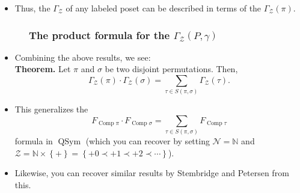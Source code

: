 \documentclass{beamer}
\newcommand{\NN}{{\mathbb N}}
\newcommand{\Comp}{\operatorname{Comp}}
\newcommand{\QSym}{\operatorname{QSym}}
\newcommand{\calN}{\mathcal{N}}
\newcommand{\calZ}{\mathcal{Z}}
\newcommand{\fti}[1]{\frametitle{\ \ \ \ \ #1}}
\newcommand{\set}[1]{\left\{ #1 \right\}}
\newcommand{\tup}[1]{\left( #1 \right)}
\theoremstyle{plain}
\begin{document}
\begin{frame}
\begin{itemize}
\pause

\item Thus, the $\Gamma_{\calZ}$ of any labeled poset can be
described in terms of the $\Gamma_{\calZ} \tup{\pi}$.

\end{itemize}

\vspace{5cm}

\end{frame}

\begin{frame}
\fti{The product formula for the $\Gamma_{\calZ}\tup{P,\gamma}$}

\begin{itemize}

\item Combining the above results, we see: \\
      \textbf{Theorem.} Let $\pi$ and $\sigma$ be two disjoint
      permutations. Then,
\[
\Gamma_{\mathcal{Z}}\left(  \pi\right)  \cdot 
\Gamma_{\mathcal{Z}} \left(
\sigma\right)  =\sum_{\tau\in S\left(  \pi,\sigma\right)  }\Gamma
_{\mathcal{Z}}\left(  \tau\right)  .
\]      

\pause

\item This generalizes the
      \[
      F_{\Comp \pi} \cdot F_{\Comp \sigma}
      = \sum\limits_{\tau \in S\tup{\pi, \sigma}} F_{\Comp \tau}
      \]
      formula in $\QSym$
      (which you can recover by setting $\calN = \NN$
      and
      $\calZ = \NN \times \set{+} = \set{+0 \prec +1 \prec +2 \prec \cdots}$).

\item Likewise, you can recover similar results by Stembridge
      and Petersen from this.

\end{itemize}

\end{frame}
\end{document}
